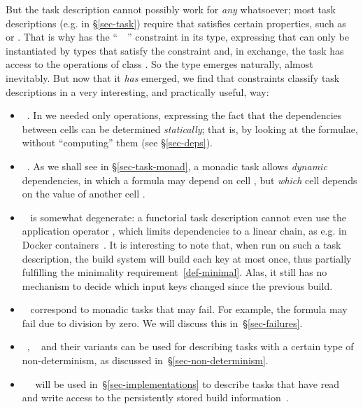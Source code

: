But the task description cannot possibly work for \emph{any}  whatsoever; most task
descriptions (e.g.  in \S\ref{sec-task}) require that 
satisfies certain properties, such as  or . That is
why  has the ``~~\hs{=>}'' constraint in its type,
expressing that  can only be instantiated by types that satisfy the
constraint  and, in exchange, the task has access to the operations of class .
So the type  emerges naturally, almost inevitably.
But now that it \emph{has} emerged, we find that constraints  classify
task descriptions in a very interesting, and practically useful, way:
\begin{itemize}
\item {}~. In  we needed only 
  operations, expressing the fact that the dependencies between cells can be
  determined \emph{statically}; that is, by looking at the formulae, without
  ``computing'' them (see \S\ref{sec-deps}).
\item {}~. As we shall see in \S\ref{sec-task-monad}, a monadic
  task allows \emph{dynamic} dependencies, in which a formula may depend on cell
  , but \emph{which} cell  depends on the value of another cell
  .
\item {}~ is somewhat degenerate: a functorial task
  description cannot even use the application operator \hs{<*>}, which limits
  dependencies to a linear chain, as e.g. in Docker containers~\cite{docker}. It
  is interesting to note that, when run on such a task description, the
   build system will build each key at most once, thus partially
  fulfilling the minimality requirement~\ref{def-minimal}. Alas, it still has no
  mechanism to decide which input keys changed since the previous build.
\item {}~ correspond to monadic tasks that may fail. For
  example, the formula  may fail due to division by zero. We will
  discuss this in~\S\ref{sec-failures}.
\item {}~, ~ and their
  variants can be used for describing tasks with a certain type of
  non-determinism, as discussed in~\S\ref{sec-non-determinism}.
\item {}~~ will be used
  in~\S\ref{sec-implementations} to describe tasks that have read and write
  access to the persistently stored build information~.
\end{itemize}

